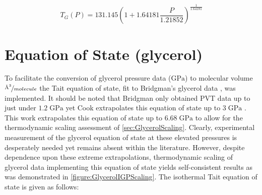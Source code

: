 \begin{table}[h!]
	\begin{center}
		\caption{Cumene \tgp Data}
		\label{table:IGPdata}
	\end{center}
\end{table}

\begin{equation}
\label{equ:IGPcumene}
T_{G}(P)=131.145\left ( 1+1.64181\frac{P}{1.21852} \right )^{\frac{1}{1.64181}}
\end{equation}


\chapter{Equation of State (glycerol)} \label{app:GlycerolEOS}
To facilitate the conversion of glycerol pressure data ($\si{\giga\pascal}$) to molecular volume $\nicefrac{\si{\angstrom\cubed}}{molecule}$ the Tait equation of state, fit to Bridgman's glycerol data \cite{BridgmanGly}, was implemented.  It should be noted that Bridgman only obtained PVT data up to just under $1.2\;\si{\giga\pascal}$ yet Cook \etal extrapolates this equation of state up to $3\;\si{\giga\pascal}$ \cite{Cook2}. This work extrapolates this equation of state up to $6.68\;\si{\giga\pascal}$ to allow for the thermodynamic scaling assessment of \sect \ref{sec:GlycerolScaling}.  Clearly, experimental measurement of the glycerol equation of state at these elevated pressures is desperately needed yet remains absent within the literature.  However, despite dependence upon these extreme extrapolations, thermodynamic scaling of glycerol data implementing this equation of state yields self-consistent results as was demonstrated in \fig \ref{figure:GlycerolIGPScaling}. The isothermal Tait equation of state is given as follows:

